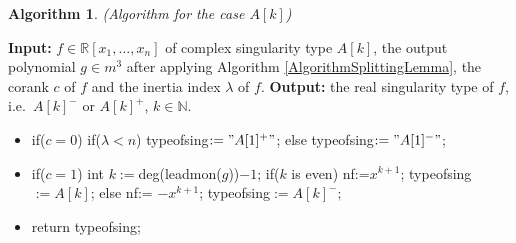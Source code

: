 \documentclass{amsproc}
\begin{document}
\newtheorem{A[k]}[kjet]{Algorithm}
\begin{A[k]}(Algorithm for the case $A[k]$)
\end{A[k]}
\noindent\textnormal{\bf Input:} $f\in \mathbb R[x_1,\ldots,x_n]$ of complex singularity type $A[k]$, the output polynomial $g\in m^3$ after applying Algorithm \ref{AlgorithmSplittingLemma}, the corank $c$ of $f$ and the inertia index $\lambda$ of $f$.\newline
\textnormal{\bf Output:} the real singularity type of $f$, i.e.~$A[k]^-$ or $A[k]^+$, $k\in\mathbb N$.
\begin{itemize}
\item if($c=0$)\newline
\phantom{}\quad if($\lambda<n$)\newline
\phantom{}\quad\quad typeofsing$:="A[1]^+"$;\newline
\phantom{}\quad else\newline
\phantom{}\quad\quad typeofsing$:="A[1]^-"$;
\item if($c=1$)\newline
\phantom{}\quad int $k:= $deg(leadmon($g$))$ -1$;\newline
\phantom{}\quad if($k$ is even)\newline
\phantom{}\quad\quad nf:=$x^{k+1}$;\newline
\phantom{}\quad\quad typeofsing$:= A[k]$;\newline
\phantom{}\quad else\newline
\phantom{}\quad\quad nf:= $-x^{k+1}$;\newline
\phantom{}\quad\quad typeofsing$:= A[k]^-;$
\item return typeofsing;
\end{itemize}
\end{document}
